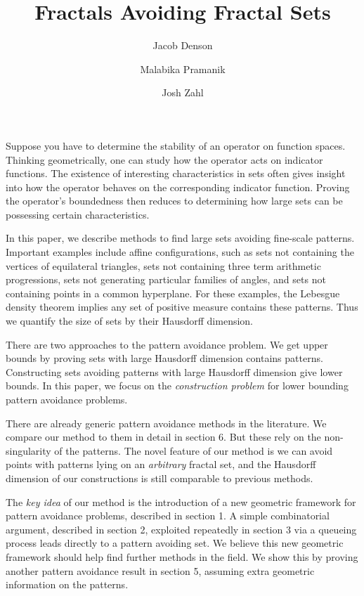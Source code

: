 \documentclass{article}
\title{Fractals Avoiding Fractal Sets}
\author{Jacob Denson\\ \and Malabika Pramanik\\ \and Josh Zahl}
\theoremstyle{plain}
\theoremstyle{plain}
\begin{document}
\maketitle

\begin{multicols}{2}

\begin{abstract}
	\blindtext[1]
\end{abstract}

Suppose you have to determine the stability of an operator on function spaces. Thinking geometrically, one can study how the operator acts on indicator functions. The existence of interesting characteristics in sets often gives insight into how the operator behaves on the corresponding indicator function. Proving the operator's boundedness then reduces to determining how large sets can be possessing certain characteristics.


In this paper, we describe methods to find large sets avoiding fine-scale patterns. Important examples include affine configurations, such as sets not containing the vertices of equilateral triangles, sets not containing three term arithmetic progressions, sets not generating particular families of angles, and sets not containing points in a common hyperplane. For these examples, the Lebesgue density theorem implies any set of positive measure contains these patterns. Thus we quantify the size of sets by their Hausdorff dimension.

There are two approaches to the pattern avoidance problem. We get upper bounds by proving sets with large Hausdorff dimension contains patterns. Constructing sets avoiding patterns with large Hausdorff dimension give lower bounds. In this paper, we focus on the {\it construction problem} for lower bounding pattern avoidance problems.

There are already generic pattern avoidance methods in the literature. We compare our method to them in detail in section 6. But these rely on the non-singularity of the patterns. The novel feature of our method is we can avoid points with patterns lying on an {\it arbitrary} fractal set, and the Hausdorff dimension of our constructions is still comparable to previous methods.

The {\it key idea} of our method is the introduction of a new geometric framework for pattern avoidance problems, described in section 1. A simple combinatorial argument, described in section 2, exploited repeatedly in section 3 via a queueing process leads directly to a pattern avoiding set. We believe this new geometric framework should help find further methods in the field. We show this by proving another pattern avoidance result in section 5, assuming extra geometric information on the patterns.


\end{multicols}
\end{document}
